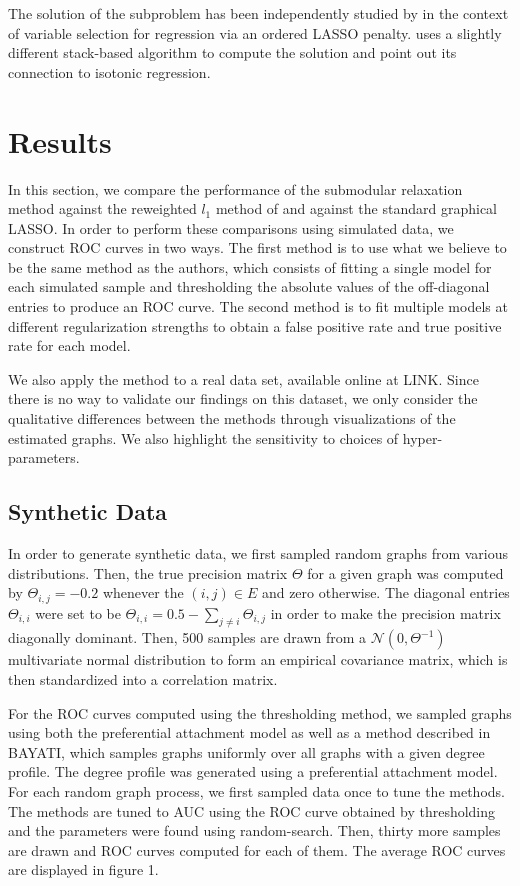 \documentclass{uwstat572}
\theoremstyle{remark}
\theoremstyle{definition}
\begin{document}
The solution of the subproblem has been independently studied by \cite{su2016} in the context of variable selection for regression via an ordered LASSO penalty.  \cite{su2016} uses a slightly different stack-based algorithm to compute the solution and point out its connection to isotonic regression.


\section{Results}

In this section, we compare the performance of the submodular relaxation method against the reweighted $l_1$ method of \cite{liu11c} and against the standard graphical LASSO.  In order to perform these comparisons using simulated data, we construct ROC curves in two ways.  The first method is to use what we believe to be the same method as the authors, which consists of fitting a single model for each simulated sample and thresholding the absolute values of the off-diagonal entries to produce an ROC curve.  The second method is to fit multiple models at different regularization strengths to obtain a false positive rate and true positive rate for each model.

We also apply the method to a real data set, available online at LINK.  Since there is no way to validate our findings on this dataset, we only consider the qualitative differences between the methods through visualizations of the estimated graphs. We also highlight the sensitivity to choices of hyper-parameters.

\subsection{Synthetic Data}

In order to generate synthetic data, we first sampled random graphs from various distributions.  Then, the true precision matrix $\Theta$ for a given graph was computed by $\Theta_{i,j} = -0.2$ whenever the $(i,j) \in E$ and zero otherwise.  The diagonal entries $\Theta_{i,i}$ were set to be $\Theta_{i,i} = 0.5 - \sum_{j \neq i} \Theta_{i,j}$ in order to make the precision matrix diagonally dominant.  Then, 500 samples are drawn from a  $\mathcal{N}(0,\Theta^{-1})$ multivariate normal distribution to form an empirical covariance matrix, which is then standardized into a correlation matrix.

For the ROC curves computed using the thresholding method, we sampled graphs using both the preferential attachment model as well as a method described in BAYATI, which samples graphs uniformly over all graphs with a given degree profile.  The degree profile was generated using a preferential attachment model.  For each random graph process, we first sampled data once to tune the methods.   The methods are tuned to AUC using the ROC curve obtained by thresholding and the parameters were found using random-search.  Then, thirty more samples are drawn and ROC curves computed for each of them.  The average ROC curves are displayed in figure 1.
\end{document}
